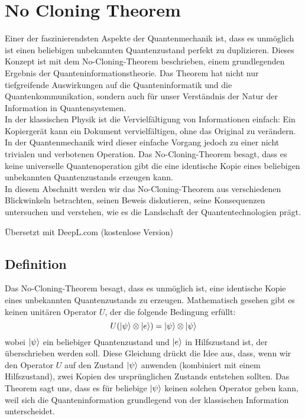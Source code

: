 \section{No Cloning Theorem} \label{sec:no-cloning}

Einer der faszinierendsten Aspekte der Quantenmechanik ist, dass es unmöglich ist
einen beliebigen unbekannten Quantenzustand perfekt zu duplizieren.
Dieses Konzept ist mit dem No-Cloning-Theorem beschrieben, einem grundlegenden Ergebnis der Quanteninformationstheorie.
Das Theorem hat nicht nur tiefgreifende Auswirkungen auf die Quanteninformatik und die Quantenkommunikation,
sondern auch für unser Verständnis der Natur der Information in Quantensystemen.\\

In der klassischen Physik ist die Vervielfältigung von Informationen einfach:
Ein Kopiergerät kann ein Dokument vervielfältigen, ohne das Original zu verändern.
In der Quantenmechanik wird dieser einfache Vorgang jedoch zu einer nicht trivialen und verbotenen Operation.
Das No-Cloning-Theorem besagt, dass es keine universelle Quantenoperation gibt
die eine identische Kopie eines beliebigen unbekannten Quantenzustands erzeugen kann.\\

In diesem Abschnitt werden wir das No-Cloning-Theorem aus verschiedenen Blickwinkeln betrachten, seinen Beweis diskutieren,
seine Konsequenzen untersuchen und verstehen, wie es die Landschaft der Quantentechnologien prägt.

Übersetzt mit DeepL.com (kostenlose Version)
\subsection{Definition}\label{subsec:definition}
Das No-Cloning-Theorem besagt, dass es unmöglich ist, eine identische Kopie eines unbekannten Quantenzustands zu erzeugen.
Mathematisch gesehen gibt es keinen unitären Operator $U$, der die folgende Bedingung erfüllt:
\begin{equation}
    U(\ket{\psi}\otimes\ket{e})=\ket{\psi}\otimes\ket{\psi}\label {eq:cloning_assertion}
\end{equation}
wobei $\ket{\psi}$ ein beliebiger Quantenzustand und $\ket{e}$ in Hilfszustand ist, der überschrieben werden soll.
Diese Gleichung drückt die Idee aus, dass, wenn wir den Operator $U$ auf den Zustand $\ket{\psi}$ anwenden
(kombiniert mit einem Hilfszustand), zwei Kopien des ursprünglichen Zustands entstehen sollten.
Das Theorem sagt uns, dass es für beliebige $\ket{\psi}$ keinen solchen Operator geben kann,
weil sich die Quanteninformation grundlegend von der klassischen Information unterscheidet.
